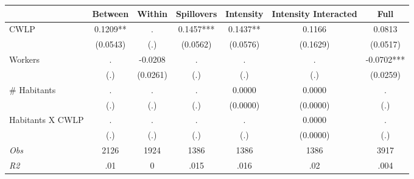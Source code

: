 \begin{tabular}{l*{6}{c}}\hline&\multicolumn{1}{c}{Between}&\multicolumn{1}{c}{Within}&\multicolumn{1}{c}{Spillovers}&\multicolumn{1}{c}{Intensity}&\multicolumn{1}{c}{Intensity Interacted}&\multicolumn{1}{c}{Full}\\ \hline 
CWLP & 0.1209** & . & 0.1457*** & 0.1437** & 0.1166 & 0.0813 \\
 & (0.0543) & (.) & (0.0562) & (0.0576) & (0.1629) & (0.0517) \\
Workers & . & -0.0208 & . & . & . & -0.0702*** \\
 & (.) & (0.0261) & (.) & (.) & (.) & (0.0259) \\
\# Habitants & . & . & . & 0.0000 & 0.0000 & . \\
 & (.) & (.) & (.) & (0.0000) & (0.0000) & (.) \\
Habitants X CWLP & . & . & . & . & 0.0000 & . \\
 & (.) & (.) & (.) & (.) & (0.0000) & (.) \\
\hline \textit{Obs} & 2126 & 1924 & 1386 & 1386 & 1386 & 3917 \\ \textit{R2} & .01 & 0 & .015 & .016 & .02 & .004 \\ \hline \end{tabular}
